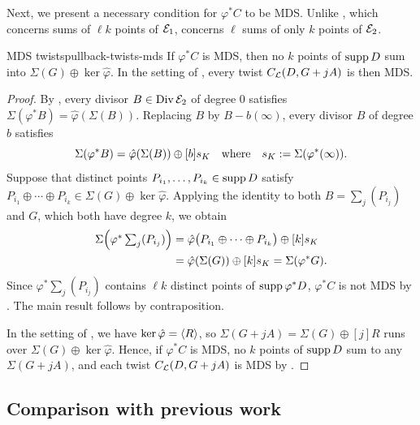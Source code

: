 \documentclass[twocolumn, 11pt]{scrartcl}
\begin{document}
Next, we present a necessary condition for $\varphi^*C$ to be MDS. Unlike , which concerns sums of $\ell k$ points of $\mathcal{E}_1$,  concerns $\ell$ sums of only $k$ points of $\mathcal{E}_2$.

\begin{corollary}{MDS twists}{pullback-twists-mds}
    If $\varphi^*C$ is MDS, then no $k$ points of $\operatorname{supp} D$ sum into $\Sigma(G)\oplus\ker\hat\varphi$. In the setting of , every twist $C_\mathcal{L}(D,G+jA)$ is then MDS.
\end{corollary}

\begin{proof}
    By , every divisor $B\in\operatorname{Div}\mathcal{E}_2$ of degree 0 satisfies $\Sigma(\varphi^*B)=\hat\varphi(\Sigma(B))$. Replacing $B$ by $B-b(\infty)$, every divisor $B$ of degree $b$ satisfies
    \[ \Sigma(\varphi^*B)=\hat\varphi(\Sigma(B))\oplus[b]s_K \quad\text{where}\quad s_K:=\Sigma(\varphi^*(\infty)). \]
    Suppose that distinct points $P_{i_1},\hdots,P_{i_k}\in\operatorname{supp} D$ satisfy $P_{i_1}\oplus\cdots\oplus P_{i_k}\in\Sigma(G)\oplus\ker\hat\varphi$. Applying the identity to both $B=\sum_j(P_{i_j})$ and $G$, which both have degree $k$, we obtain
    \begin{align*}
        \textstyle \Sigma\pa*{\varphi^*\sum_j(P_{i_j})}&=\hat\varphi\pa[\big]{P_{i_1}\oplus\cdots\oplus P_{i_k}}\oplus[k]s_K \\
        &=\hat\varphi(\Sigma(G))\oplus[k]s_K=\Sigma(\varphi^*G).
    \end{align*}
    Since $\varphi^*\sum_j(P_{i_j})$ contains $\ell k$ distinct points of $\operatorname{supp}\varphi^*D$, $\varphi^*C$ is not MDS by . The main result follows by contraposition.

    In the setting of , we have $\ker\hat\varphi=\langle R\rangle$, so $\Sigma(G+jA)=\Sigma(G)\oplus[j]R$ runs over $\Sigma(G)\oplus\ker\hat\varphi$. Hence, if $\varphi^*C$ is MDS, no $k$ points of $\operatorname{supp} D$ sum to any $\Sigma(G+jA)$, and each twist $C_\mathcal{L}(D,G+jA)$ is MDS by .
\end{proof}

\subsection{Comparison with previous work}
\end{document}
